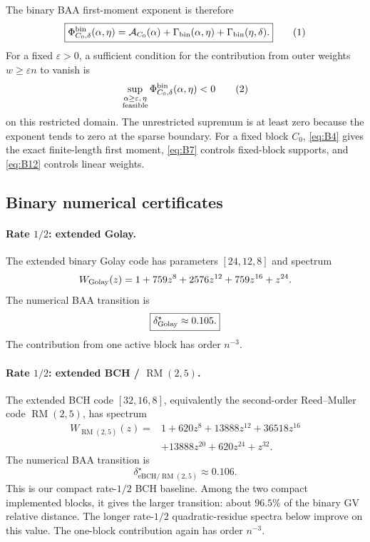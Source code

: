 The binary BAA first-moment exponent is therefore
\[
    \boxed{
    \Phi^{\rm bin}_{C_0,\delta}(\alpha,\eta)
      =
    \mathcal A_{C_0}(\alpha)
    +\Gamma_{\rm bin}(\alpha,\eta)
    +\Gamma_{\rm bin}(\eta,\delta).
    }
    \eqnumlabel{eq:B11}
\]
For a fixed $\varepsilon>0$, a sufficient condition for the contribution
from outer weights $w\ge\varepsilon n$ to vanish is
\[
    \sup_{\substack{\alpha\ge\varepsilon,\,\eta\\\text{feasible}}}
       \Phi^{\rm bin}_{C_0,\delta}(\alpha,\eta)<0
    \eqnumlabel{eq:B12}
\]
on this restricted domain.  The unrestricted supremum is at least zero
because the exponent tends to zero at the sparse boundary.
For a fixed block $C_0$, \eqref{eq:B4} gives the exact
finite-length first moment, \eqref{eq:B7} controls fixed-block supports, and \eqref{eq:B12}
controls linear weights.




\subsection{Binary numerical certificates}
\label{app:binary-certificate}

\paragraph{Rate $1/2$: extended Golay.}
The extended binary Golay code has parameters $[24,12,8]$ and spectrum
\[
    W_{\rm Golay}(z)
      =
    1+759z^8+2576z^{12}+759z^{16}+z^{24}.
\]
The numerical BAA transition is
\[
    \boxed{\delta^\star_{\rm Golay}\approx0.105.}
\]
The contribution from one active block has order $n^{-3}$.

\paragraph{Rate $1/2$: extended BCH / $\operatorname{RM}(2,5)$.}
The extended BCH code $[32,16,8]$, equivalently the second-order Reed--Muller
code $\operatorname{RM}(2,5)$, has spectrum
\[
\begin{aligned}
    W_{\operatorname{RM}(2,5)}(z)
      ={}&
    1+620z^8+13888z^{12}+36518z^{16}
    \\
    &+13888z^{20}+620z^{24}+z^{32}.
\end{aligned}
\]
The numerical BAA transition is
\[
    \boxed{\delta^\star_{\mathrm{eBCH}/\operatorname{RM}(2,5)}
      \approx0.106.}
\]
This is our compact rate-$1/2$ BCH baseline.  Among the two compact implemented
blocks, it gives the larger transition: about $96.5\%$ of the binary GV
 relative distance.  The longer rate-$1/2$ quadratic-residue spectra below
 improve on this value.  The one-block contribution again has order $n^{-3}$.

